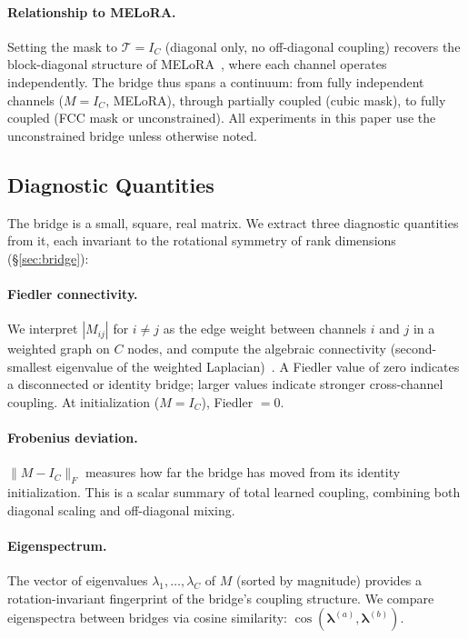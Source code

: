 \paragraph{Relationship to MELoRA.}
Setting the mask to $\mathcal{T} = I_C$ (diagonal only, no
off-diagonal coupling) recovers the block-diagonal structure of
MELoRA~\cite{ren2024melora}, where each channel operates independently.
The bridge thus spans a continuum: from fully independent channels
($M = I_C$, MELoRA), through partially coupled (cubic mask), to fully
coupled (FCC mask or unconstrained).
All experiments in this paper use the unconstrained bridge unless
otherwise noted.

\subsection{Diagnostic Quantities}
\label{sec:diagnostics}

The bridge is a small, square, real matrix.
We extract three diagnostic quantities from it, each invariant to the
rotational symmetry of rank dimensions (\S\ref{sec:bridge}):

\paragraph{Fiedler connectivity.}
We interpret $|M_{ij}|$ for $i \neq j$ as the edge weight between
channels $i$ and $j$ in a weighted graph on $C$ nodes, and compute the
algebraic connectivity (second-smallest eigenvalue of the weighted
Laplacian)~\cite{fiedler1973algebraic}.
A Fiedler value of zero indicates a disconnected or identity bridge;
larger values indicate stronger cross-channel coupling.
At initialization ($M = I_C$), Fiedler $= 0$.

\paragraph{Frobenius deviation.}
$\|M - I_C\|_F$ measures how far the bridge has moved from its
identity initialization.
This is a scalar summary of total learned coupling, combining both
diagonal scaling and off-diagonal mixing.

\paragraph{Eigenspectrum.}
The vector of eigenvalues $\lambda_1, \ldots, \lambda_C$ of $M$
(sorted by magnitude) provides a rotation-invariant fingerprint of
the bridge's coupling structure.
We compare eigenspectra between bridges via cosine similarity:
$\operatorname{cos}(\boldsymbol{\lambda}^{(a)},
\boldsymbol{\lambda}^{(b)})$.

